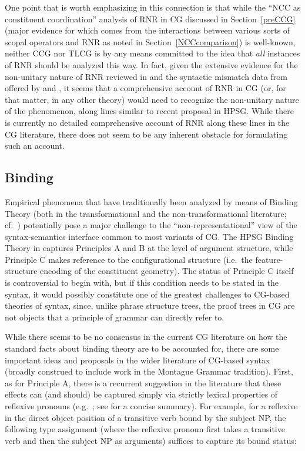 \documentclass[output=paper,biblatex,babelshorthands,newtxmath,draftmode,colorlinks,citecolor=brown]{langscibook}
\begin{document}
One point that is worth emphasizing in this connection is that
while the ``NCC as constituent coordination'' analysis of RNR in CG
discussed in Section~\ref{preCCG} (major evidence for which comes from the
interactions between various sorts of scopal operators and RNR as
noted in Section~\ref{NCCcomparison}) is well-known, neither CCG nor TLCG is by
any means committed to the idea that \emph{all} instances of RNR should be
analyzed this way.
In fact, given the extensive evidence for the non-unitary nature of
RNR reviewed in \citet{Chaves2014a-u} and the syntactic mismatch data from
 offered by \citet{ACS2016a-u} and \citet{SAHM2019a-u}, it seems
that a comprehensive account of RNR in CG (or, for that matter, in any
other theory) would need to recognize the
non-unitary nature of the phenomenon, along lines similar to
 recent proposal in HPSG. While there is currently no
detailed comprehensive account of RNR along these lines in the
CG literature, there does not  seem to be any inherent 
obstacle for formulating such an account.


\subsection{Binding}
\label{cg:binding}

%
Empirical phenomena that have traditionally been analyzed by means of
Binding Theory (both in the transformational and the
non-transformational literature; cf.~)
potentially pose a major challenge to the
``non-representational'' view of the syntax-semantics interface common
to most variants of CG. The HPSG Binding Theory in \textcites{PS92a}[Chapter~6]{ps2}
captures Principles A and B at the level of argument structure, while
Principle C makes reference to the configurational structure (i.e.\
the feature-structure encoding of the constituent geometry). The
status of Principle C\is{principle!Binding!Principle C} itself is controversial to begin with, but if
this condition needs to be stated in the syntax, it would possibly
constitute one of the greatest challenges to CG-based theories of
syntax, since, unlike phrase structure trees, the proof trees in CG
are not objects that a principle of grammar can directly refer to.

While there seems to be no consensus in the current CG literature on
how the standard
facts about binding theory are to be accounted for, there are
some important ideas and proposals in the wider literature of CG-based
syntax (broadly construed to include work in the Montague Grammar
tradition). First, as for Principle A, there is a recurrent suggestion
in the literature that these effects can (and should) be captured
simply via strictly lexical properties of reflexive pronouns
(e.g.\ \citealt{keenan88binding,szabolcsi1992}; see \citealt[43--44]{buringbinding} for a concise summary).
For example, for a reflexive in the direct object position
of a transitive verb bound by the subject NP,
the following type assignment (where the reflexive pronoun first takes
a transitive verb and then the subject NP as arguments) suffices to
capture its bound status:
\end{document}
